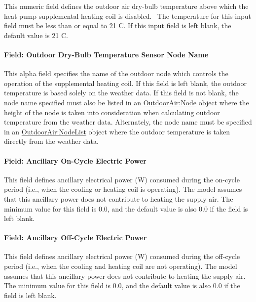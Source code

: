 This numeric field defines the outdoor air dry-bulb temperature above which the heat pump supplemental heating coil is disabled.~ The temperature for this input field must be less than or equal to 21 C. If this input field is left blank, the default value is 21 C.

\paragraph{Field: Outdoor Dry-Bulb Temperature Sensor Node Name}\label{field-outdoor-dry-bulb-temperature-sensor-node-name}

This alpha field specifies the name of the outdoor node which controls the operation of the supplemental heating coil. If this field is left blank, the outdoor temperature is based solely on the weather data. If this field is not blank, the node name specified must also be listed in an \hyperref[outdoorairnode]{OutdoorAir:Node} object where the height of the node is taken into consideration when calculating outdoor temperature from the weather data. Alternately, the node name must be specified in an \hyperref[outdoorairnodelist]{OutdoorAir:NodeList} object where the outdoor temperature is taken directly from the weather data.

\paragraph{Field: Ancillary On-Cycle Electric Power}\label{field-ancillary-on-cycle-electric-power}

This field defines ancillary electrical power (W) consumed during the on-cycle period (i.e., when the cooling or heating coil is operating). The model assumes that this ancillary power does not contribute to heating the supply air. The minimum value for this field is 0.0, and the default value is also 0.0 if the field is left blank.

\paragraph{Field: Ancillary Off-Cycle Electric Power}\label{field-ancillary-off-cycle-electric-power}

This field defines ancillary electrical power (W) consumed during the off-cycle period (i.e., when the cooling and heating coil are not operating). The model assumes that this ancillary power does not contribute to heating the supply air. The minimum value for this field is 0.0, and the default value is also 0.0 if the field is left blank.

